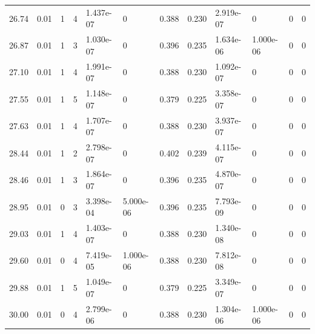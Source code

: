 \documentclass[preview]{standalone}
\begin{document}
{{{\begin{tabular}{L{1.2cm}C{1.2cm} C{0.3cm}C{0.5cm} C{1.4cm}C{1.4cm} C{1.4cm}C{1.4cm} C{1.6cm}C{1.6cm} C{1.6cm}C{1.6cm}}
  26.74  &  0.01  & 1     &  4 &  1.437e-07  & 0  &  0.388&   0.230& 2.919e-07 & 0   &  0 & 0  \\ 
  26.87  &  0.01  & 1     &  3 &  1.030e-07  & 0  &  0.396&   0.235& 1.634e-06 & 1.000e-06   &  0 & 0  \\ 
  27.10  &  0.01  & 1     &  4 &  1.991e-07  & 0  &  0.388&   0.230& 1.092e-07 & 0   &  0 & 0  \\ 
  27.55  &  0.01  & 1     &  5 &  1.148e-07  & 0  &  0.379&   0.225& 3.358e-07 & 0   &  0 & 0  \\ 
  27.63  &  0.01  & 1     &  4 &  1.707e-07  & 0  &  0.388&   0.230& 3.937e-07 & 0   &  0 & 0  \\ 
  28.44  &  0.01  & 1     &  2 &  2.798e-07  & 0  &  0.402&   0.239& 4.115e-07 & 0   &  0 & 0  \\ 
  28.46  &  0.01  & 1     &  3 &  1.864e-07  & 0  &  0.396&   0.235& 4.870e-07 & 0   &  0 & 0  \\ 
  28.95  &  0.01  & 0     &  3 &  3.398e-04  & 5.000e-06  &  0.396&   0.235& 7.793e-09 & 0   &  0 & 0  \\ 
  29.03  &  0.01  & 1     &  4 &  1.403e-07  & 0  &  0.388&   0.230& 1.340e-08 & 0   &  0 & 0  \\ 
  29.60  &  0.01  & 0     &  4 &  7.419e-05  & 1.000e-06  &  0.388&   0.230& 7.812e-08 & 0   &  0 & 0  \\ 
  29.88  &  0.01  & 1     &  5 &  1.049e-07  & 0  &  0.379&   0.225& 3.349e-07 & 0   &  0 & 0  \\ 
  30.00  &  0.01  & 0     &  4 &  2.799e-06  & 0  &  0.388&   0.230& 1.304e-06 & 1.000e-06   &  0 & 0  \\ 
\hline 
\end{tabular} 

}}}
\end{document}
